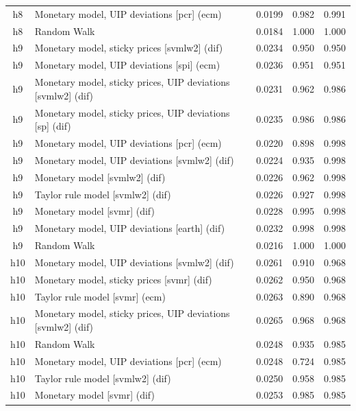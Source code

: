 \begin{ThreePartTable}
\begin{longtable}[t]{cp{5.5cm}ccc}
h8 & \raggedright Monetary model, UIP deviations [pcr] (ecm) & 0.0199 & 0.982 & 0.991\\
h8 & \raggedright Random Walk & 0.0184 & 1.000 & 1.000\\
\addlinespace
h9 & \raggedright Monetary model, sticky prices [svmlw2] (dif) & 0.0234 & 0.950 & 0.950\\
h9 & \raggedright Monetary model, UIP deviations [spi] (ecm) & 0.0236 & 0.951 & 0.951\\
h9 & \raggedright Monetary model, sticky prices, UIP deviations [svmlw2] (dif) & 0.0231 & 0.962 & 0.986\\
h9 & \raggedright Monetary model, sticky prices, UIP deviations [sp] (dif) & 0.0235 & 0.986 & 0.986\\
h9 & \raggedright Monetary model, UIP deviations [pcr] (ecm) & 0.0220 & 0.898 & 0.998\\
h9 & \raggedright Monetary model, UIP deviations [svmlw2] (dif) & 0.0224 & 0.935 & 0.998\\
h9 & \raggedright Monetary model [svmlw2] (dif) & 0.0226 & 0.962 & 0.998\\
h9 & \raggedright Taylor rule model [svmlw2] (dif) & 0.0226 & 0.927 & 0.998\\
h9 & \raggedright Monetary model [svmr] (dif) & 0.0228 & 0.995 & 0.998\\
h9 & \raggedright Monetary model, UIP deviations [earth] (dif) & 0.0232 & 0.998 & 0.998\\
h9 & \raggedright Random Walk & 0.0216 & 1.000 & 1.000\\
\addlinespace
h10 & \raggedright Monetary model, UIP deviations [svmlw2] (dif) & 0.0261 & 0.910 & 0.968\\
h10 & \raggedright Monetary model, sticky prices [svmr] (dif) & 0.0262 & 0.950 & 0.968\\
h10 & \raggedright Taylor rule model [svmr] (ecm) & 0.0263 & 0.890 & 0.968\\
h10 & \raggedright Monetary model, sticky prices, UIP deviations [svmlw2] (dif) & 0.0265 & 0.968 & 0.968\\
h10 & \raggedright Random Walk & 0.0248 & 0.935 & 0.985\\
h10 & \raggedright Monetary model, UIP deviations [pcr] (ecm) & 0.0248 & 0.724 & 0.985\\
h10 & \raggedright Taylor rule model [svmlw2] (dif) & 0.0250 & 0.958 & 0.985\\
h10 & \raggedright Monetary model [svmr] (dif) & 0.0253 & 0.985 & 0.985\\

\end{longtable}
\end{ThreePartTable}
